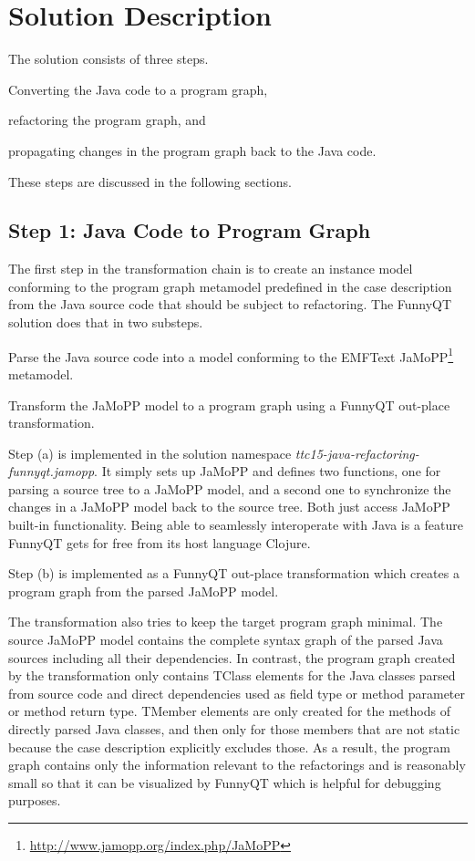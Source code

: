 \documentclass[submission]{eptcs}
\begin{document}
\section{Solution Description}
\label{sec:solution-description}

The solution consists of three steps.
\begin{inparaenum}[(1)]
\item Converting the Java code to a program graph,
\item refactoring the program graph, and
\item propagating changes in the program graph back to the Java code.
\end{inparaenum}
These steps are discussed in the following sections.

\subsection{Step 1: Java Code to Program Graph}
\label{sec:step-1:java-to-pg}

The first step in the transformation chain is to create an instance model
conforming to the program graph metamodel predefined in the case description
from the Java source code that should be subject to refactoring.  The FunnyQT
solution does that in two substeps.
\begin{compactenum}[(a)]
\item Parse the Java source code into a model conforming to the EMFText
  JaMoPP\footnote{\url{http://www.jamopp.org/index.php/JaMoPP}} metamodel.
\item Transform the JaMoPP model to a program graph using a FunnyQT out-place
  transformation.
\end{compactenum}
Step (a) is implemented in the solution namespace
\emph{ttc15-java-refactoring-funnyqt.jamopp}.  It simply sets up JaMoPP and
defines two functions, one for parsing a source tree to a JaMoPP model, and a
second one to synchronize the changes in a JaMoPP model back to the source
tree.  Both just access JaMoPP built-in functionality.  Being able to
seamlessly interoperate with Java is a feature FunnyQT gets for free from its
host language Clojure.

Step (b) is implemented as a FunnyQT out-place transformation which creates a
program graph from the parsed JaMoPP model.

The transformation also tries to keep the target program graph minimal.  The
source JaMoPP model contains the complete syntax graph of the parsed Java
sources including all their dependencies.  In contrast, the program graph
created by the transformation only contains \textsf{TClass} elements for the
Java classes parsed from source code and direct dependencies used as field type
or method parameter or method return type.  \textsf{TMember} elements are only
created for the methods of directly parsed Java classes, and then only for
those members that are not static because the case description explicitly
excludes those.  As a result, the program graph contains only the information
relevant to the refactorings and is reasonably small so that it can be
visualized by FunnyQT which is helpful for debugging purposes.
\end{document}
